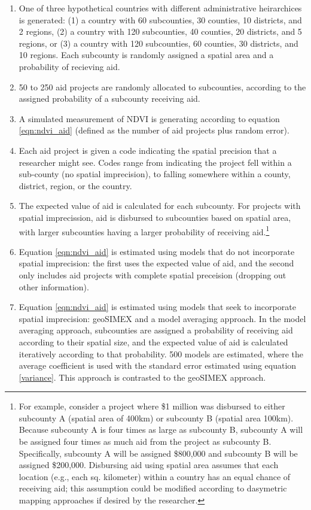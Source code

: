 \begin{enumerate}
\item One of three hypothetical countries with different administrative heirarchices is generated: (1) a country with 60 subcounties, 30 counties, 10 districts, and 2 regions, (2) a country with 120 subcounties, 40 counties, 20 districts, and 5 regions, or (3) a country with 120 subcounties, 60 counties, 30 districts, and 10 regions. Each subcounty is randomly assigned a spatial area and a probability of recieving aid. 
\item 50 to 250 aid projects are randomly allocated to subcounties, according to the assigned probability of a subcounty receiving aid. 
\item A simulated measurement of NDVI is generating according to equation \ref{eqn:ndvi_aid} (defined as the number of aid projects plus random error).
\item Each aid project is given a code indicating the spatial precision that a researcher might see. Codes range from indicating the project fell within a sub-county (no spatial imprecision), to falling somewhere within a county, district, region, or the country. 
\item The expected value of aid is calculated for each subcounty. For projects with spatial imprecission, aid is disbursed to subcounties based on spatial area, with larger subcounties having a larger probability of receiving aid.\footnote{For example, consider a project where \$1 million was disbursed to either subcounty A (spatial area of 400km) or subcounty B (spatial area 100km). Because subcounty A is four times as large as subcounty B, subcounty A will be assigned four times as much aid from the project as subcounty B. Specifically, subcounty A will be assigned \$800,000 and subcounty B will be assigned \$200,000. Disbursing aid using spatial area assumes that each location (e.g., each sq. kilometer) within a country has an equal chance of receiving aid; this assumption could be modified according to dasymetric mapping approaches if desired by the researcher.}
\item Equation \ref{eqn:ndvi_aid} is estimated using  models that do not incorporate spatial imprecision: the first uses the expected value of aid, and the second only includes aid projects with complete spatial preceision (dropping out other information).
\item Equation \ref{eqn:ndvi_aid} is estimated using models that seek to incorporate spatial imprecision: geoSIMEX and a model averaging approach. In the model averaging approach, subcounties are assigned a probability of receiving aid according to their spatial size, and the expected value of aid is calculated iteratively according to that probability.  500 models are estimated, where the average coefficient is used with the standard error estimated using equation \ref{variance}. This approach is contrasted to the geoSIMEX approach.
\end{enumerate}

